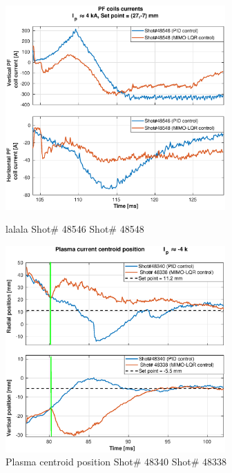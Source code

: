 \begin{figure}
	\centering
	\includegraphics[width=0.75\textwidth]{Chp5/PIDvsMIMO_546_548_curr_2.eps}
	\label{564_559curr}
	\caption{lalala  Shot\# 48546 Shot\# 48548}
\end{figure}

\begin{figure}
	\centering
	\includegraphics[width=0.75\textwidth]{Chp5/PIDvsMIMO_340_338_2.eps}
	\caption{Plasma centroid position  Shot\# 48340 Shot\# 48338}
\end{figure}

